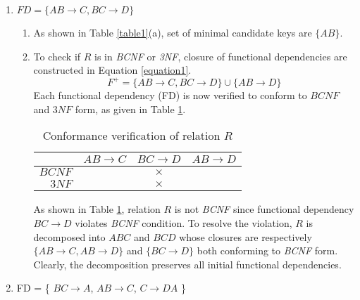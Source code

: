 \begin{enumerate}

\item $FD = \{ AB\rightarrow C, BC\rightarrow D \}$

	\begin{enumerate}[label=(\alph*)]
	\item As shown in Table \ref{table1}(a), set of minimal candidate keys are $\{AB\}$.
	\item To check if $R$ is in \textit{BCNF} or \textit{3NF}, closure of functional dependencies are constructed in Equation \ref{equation1}.
	\begin{equation}\label{equation1}
	F^+ = \{AB\rightarrow C, BC\rightarrow D\} \cup \{AB\rightarrow D\}
	\end{equation}
	Each functional dependency (FD) is now verified to conform to $BCNF$ and $3NF$ form, as given in Table \ref{table2}.
	
	\begin{table}[H]
	\centering\caption{Conformance verification of relation $R$}\label{table2}
	\begin{tabular}{|r||c|c|c|}
	\hline
	 & $AB\rightarrow C$ & $BC\rightarrow D$ & $AB \rightarrow D$\\
	\hline
	$BCNF$ & \checkmark & $\times$ & \checkmark \\
	$3NF$ & \checkmark & $\times$ & \checkmark \\
	\hline
	\end{tabular}
	\end{table}
	
	As shown in Table \ref{table2}, relation $R$ is not \textit{BCNF} since functional dependency $BC\rightarrow D$ violates \textit{BCNF} condition.
To resolve the violation, $R$ is decomposed into $ABC$ and $BCD$ whose closures are respectively $\{AB\rightarrow C, AB\rightarrow D\}$ and $\{BC\rightarrow D\}$ both conforming to \textit{BCNF} form.
Clearly, the decomposition preserves all initial functional dependencies.

	\end{enumerate}

\item FD = \{ $BC\rightarrow A$, $AB\rightarrow C$, $C\rightarrow DA$ \}


\end{enumerate}
